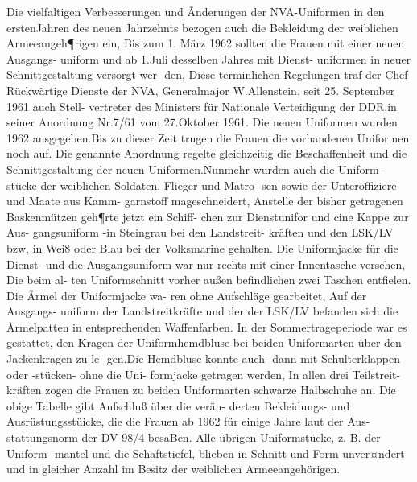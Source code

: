 

Die vielfaltigen Verbesserungen und Ãnderungen
der NVA-Uniformen in den erstenJahren des
neuen Jahrzehnts bezogen auch die Bekleidung der
weiblichen Armeeangeh¶rigen ein, Bis zum 1. März
1962 sollten die Frauen mit einer neuen Ausgangs-
uniform und ab 1.Juli desselben Jahres mit Dienst-
uniformen in neuer Schnittgestaltung versorgt wer-
den, Diese terminlichen Regelungen traf der Chef
Rückwärtige Dienste der NVA, Generalmajor
W.Allenstein, seit 25. September 1961 auch Stell-
vertreter des Ministers für Nationale Verteidigung
der DDR,in seiner Anordnung Nr.7/61 vom
27.Oktober 1961. Die neuen Uniformen wurden
1962 ausgegeben.Bis zu dieser Zeit trugen die
Frauen die vorhandenen Uniformen noch auf.
Die genannte Anordnung regelte gleichzeitig die
Beschaffenheit und die Schnittgestaltung der neuen
Uniformen.Nunmehr wurden auch die Uniform-
stücke der weiblichen Soldaten, Flieger und Matro-
sen sowie der Unteroffiziere und Maate aus Kamm-
garnstoff mageschneidert, Anstelle der bisher getragenen Baskenmützen geh¶rte jetzt ein Schiff-
chen zur Dienstunifor und cine Kappe zur Aus-
gangsuniform -in Steingrau bei den Landstreit-
kräften und den LSK/LV bzw, in Wei8 oder Blau
bei der Volksmarine gehalten. Die Uniformjacke
für die Dienst- und die Ausgangsuniform war nur
rechts mit einer Innentasche versehen, Die beim al-
ten Uniformschnitt vorher außen befindlichen zwei
Taschen entfielen. Die Ãrmel der Uniformjacke wa-
ren ohne Aufschläge gearbeitet, Auf der Ausgangs-
uniform der Landstreitkräfte und der der LSK/LV
befanden sich die Ãrmelpatten in entsprechenden
Waffenfarben. In der Sommertrageperiode war es
gestattet, den Kragen der Uniformhemdbluse bei beiden Uniformarten über den Jackenkragen zu le-
gen.Die Hemdbluse konnte auch- dann mit
Schulterklappen oder -stücken- ohne die Uni-
formjacke getragen werden, In allen drei Teilstreit-
kräften zogen die Frauen zu beiden Uniformarten
schwarze Halbschuhe an.
Die obige Tabelle gibt Aufschluß über die verän-
derten Bekleidungs- und Ausrüstungsstüicke, die
die Frauen ab 1962 für einige Jahre laut der Aus-
stattungsnorm der DV-98/4 besaBen.
Alle übrigen Uniformstücke, z. B. der Uniform-
mantel und die Schaftstiefel, blieben in Schnitt und
Form unver¤ndert und in gleicher Anzahl im Besitz
der weiblichen Armeeangehörigen.